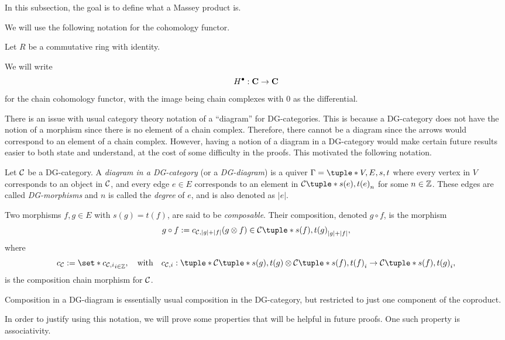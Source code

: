 In this subsection, the goal is to define what a Massey product is.

We will use the following notation for the cohomology functor.

\begin{notation}
    Let \( R \) be a commutative ring with identity.

    We will write
    \[
        H^\bullet: \operatorname{\mathbf{C}} \to \operatorname{\mathbf{C}}
    \]
    for the chain cohomology functor, with the image being chain complexes with \( 0 \) as the differential.
\end{notation}

There is an issue with usual category theory notation of a ``diagram'' for DG-categories. This is because a DG-category does not have the notion of a morphism since there is no element of a chain complex. Therefore, there cannot be a diagram since the arrows would correspond to an element of a chain complex. However, having a notion of a diagram in a DG-category would make certain future results easier to both state and understand, at the cost of some difficulty in the proofs. This motivated the following notation.

\begin{notation}
    Let \( {\mathcal{C}} \) be a DG-category. A \emph{diagram in a DG-category} (or a \emph{DG-diagram}) is a quiver \( \Gamma = \tuple*{V, E, s, t} \) where every vertex in \( V \) corresponds to an object in \( {\mathcal{C}} \), and every edge \( e \in E \) corresponds to an element in \( \Cc\tuple*{s(e), t(e)}_n \) for some \( n \in {\mathbb{Z}} \). These edges are called \emph{DG-morphisms} and \( n \) is called the \emph{degree} of \( e \), and is also denoted as \( |e| \).

    Two morphisms \( f, g \in E \) with \( s(g) = t(f) \), are said to be \emph{composable}. Their composition, denoted \( g \circ f \), is the morphism
    \[
        g \circ f := c_{\Cc, |g| + |f|}(g \otimes f) \in \Cc\tuple*{s(f), t(g)}_{|g| + |f|},
    \]
    where
    \[
        c_{\Cc} := \set*{c_{\Cc, i}}_{i \in \Zb}, \quad \text{with} \quad c_{\Cc, i}: \tuple*{ \Cc\tuple*{s(g), t(g)} \otimes \Cc\tuple*{s(f), t(f)} }_i \to \Cc\tuple*{s(f), t(g)}_i,
    \]
    is the composition chain morphism for \( {\mathcal{C}} \).
\end{notation}

Composition in a DG-diagram is essentially usual composition in the DG-category, but restricted to just one component of the coproduct.

In order to justify using this notation, we will prove some properties that will be helpful in future proofs. One such property is associativity.


